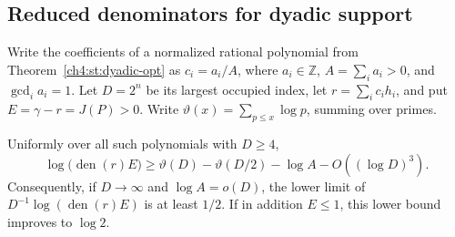 \documentclass[11pt,a4paper,oneside,openany]{report}
\theoremstyle{remark}\newtheorem{remark}[theorem]{Remark}
\numberwithin{equation}{section}
\begin{document}
\subsection{Reduced denominators for dyadic support}
Write the coefficients of a normalized rational polynomial from
Theorem~\ref{ch4:st:dyadic-opt} as $c_i=a_i/A$, where $a_i\in\mathbb Z$,
$A=\sum_i a_i>0$, and $\gcd_i a_i=1$. Let $D=2^n$ be its largest
occupied index, let $r=\sum_i c_i h_i$, and put $E=\gamma-r=J(P)>0$.
Write $\vartheta(x)=\sum_{p\le x}\log p$, summing over primes.
\begin{proposition}\label{ch4:st:dyadic-height}
Uniformly over all such polynomials with $D\ge4$,
\[
 \log\big(\operatorname{den}(r)E\big)
 \ge \vartheta(D)-\vartheta(D/2)-\log A-O((\log D)^3).
\]
Consequently, if $D\to\infty$ and $\log A=o(D)$, the lower limit of
$D^{-1}\log(\operatorname{den}(r)E)$ is at least $1/2$.
If in addition $E\le1$, this lower bound improves to $\log 2$.
\end{proposition}
\end{document}
